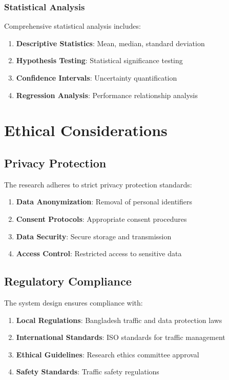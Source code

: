 \subsubsection{Statistical Analysis}

Comprehensive statistical analysis includes:

\begin{enumerate}
    \item \textbf{Descriptive Statistics}: Mean, median, standard deviation
    \item \textbf{Hypothesis Testing}: Statistical significance testing
    \item \textbf{Confidence Intervals}: Uncertainty quantification
    \item \textbf{Regression Analysis}: Performance relationship analysis
\end{enumerate}

\section{Ethical Considerations}

\subsection{Privacy Protection}

The research adheres to strict privacy protection standards:

\begin{enumerate}
    \item \textbf{Data Anonymization}: Removal of personal identifiers
    \item \textbf{Consent Protocols}: Appropriate consent procedures
    \item \textbf{Data Security}: Secure storage and transmission
    \item \textbf{Access Control}: Restricted access to sensitive data
\end{enumerate}

\subsection{Regulatory Compliance}

The system design ensures compliance with:

\begin{enumerate}
    \item \textbf{Local Regulations}: Bangladesh traffic and data protection laws
    \item \textbf{International Standards}: ISO standards for traffic management
    \item \textbf{Ethical Guidelines}: Research ethics committee approval
    \item \textbf{Safety Standards}: Traffic safety regulations
\end{enumerate}

